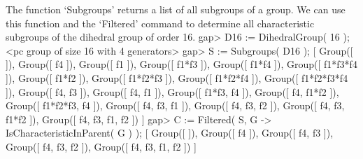     

        The function `Subgroups' returns a list of all subgroups of a group.
        We can use this function and the `Filtered' command to determine all
        characteristic subgroups of the dihedral group of order 16.
\beginexample
    gap> D16 := DihedralGroup( 16 );
    <pc group of size 16 with 4 generators>
    gap> S := Subgroups( D16 );
    [ Group([  ]), Group([ f4 ]), Group([ f1 ]), Group([ f1*f3 ]), 
      Group([ f1*f4 ]), Group([ f1*f3*f4 ]), Group([ f1*f2 ]), 
      Group([ f1*f2*f3 ]), Group([ f1*f2*f4 ]),
      Group([ f1*f2*f3*f4 ]), Group([ f4, f3 ]), Group([ f4, f1 ]),
      Group([ f1*f3, f4 ]), Group([ f4, f1*f2 ]),
      Group([ f1*f2*f3, f4 ]), Group([ f4, f3, f1 ]), 
      Group([ f4, f3, f2 ]), Group([ f4, f3, f1*f2 ]),
      Group([ f4, f3, f1, f2 ]) ]
    gap> C := Filtered( S, G -> IsCharacteristicInParent( G ) );
    [ Group([  ]), Group([ f4 ]), Group([ f4, f3 ]), Group([ f4, f3, f2 ]),
      Group([ f4, f3, f1, f2 ]) ]
\endexample
    



